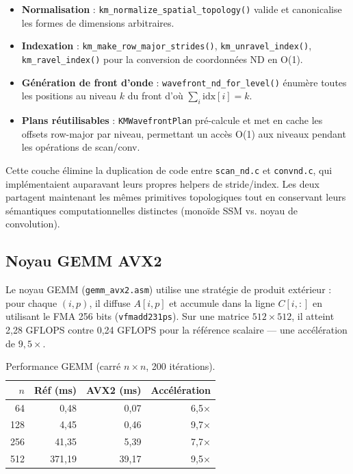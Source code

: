 \documentclass[10pt,onecolumn]{article}
\begin{document}
\begin{itemize}
  \item \textbf{Normalisation} : \texttt{km\_normalize\_spatial\_topology()} valide et
canonicalise les formes de dimensions arbitraires.
  \item \textbf{Indexation} : \texttt{km\_make\_row\_major\_strides()},
\texttt{km\_unravel\_index()}, \texttt{km\_ravel\_index()} pour la conversion de
coordonnées ND en O(1).
  \item \textbf{Génération de front d'onde} : \texttt{wavefront\_nd\_for\_level()}
énumère toutes les positions au niveau $k$ du front d'où $\sum_i \text{idx}[i] = k$.
  \item \textbf{Plans réutilisables} : \texttt{KMWavefrontPlan} pré-calcule et met
en cache les offsets row-major par niveau, permettant un accès O(1) aux niveaux
pendant les opérations de scan/conv.
\end{itemize}

Cette couche élimine la duplication de code entre \texttt{scan\_nd.c} et
\texttt{convnd.c}, qui implémentaient auparavant leurs propres helpers de
stride/index. Les deux partagent maintenant les mêmes primitives topologiques
tout en conservant leurs sémantiques computationnelles distinctes (monoïde SSM
vs.
noyau de convolution).

\subsection{Noyau GEMM AVX2}

Le noyau GEMM (\texttt{gemm\_avx2.asm}) utilise une stratégie de produit
extérieur : pour chaque $(i, p)$, il diffuse $A[i,p]$ et accumule dans la
ligne $C[i,:]$ en utilisant le FMA 256 bits (\texttt{vfmadd231ps}).
Sur une matrice $512 \times 512$, il atteint 2,28 GFLOPS contre 0,24 GFLOPS
pour la référence scalaire — une accélération de $9,5\times$.

\begin{table}[htbp]
\centering
\caption{Performance GEMM (carré $n \times n$, 200 itérations).}
\label{tab:gemm}
\begin{tabular}{rrrr}
\toprule
$n$ & Réf (ms) & AVX2 (ms) & Accélération \\
\midrule
 64 & 0,48 & 0,07 & 6,5× \\
128 & 4,45 & 0,46 & 9,7× \\
256 & 41,35 & 5,39 & 7,7× \\
512 & 371,19 & 39,17 & 9,5× \\
\bottomrule
\end{tabular}
\end{table}
\end{document}
